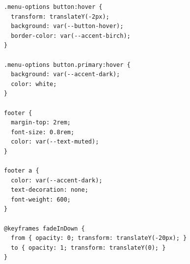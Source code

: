 \begin{scriptsize}
\begin{lstlisting}[language=html, captionpos=b, stepnumber=5, caption = {maincss.css}]
.menu-options button:hover {
  transform: translateY(-2px);
  background: var(--button-hover);
  border-color: var(--accent-birch);
}

.menu-options button.primary:hover {
  background: var(--accent-dark);
  color: white;
}

footer {
  margin-top: 2rem;
  font-size: 0.8rem;
  color: var(--text-muted);
}

footer a {
  color: var(--accent-dark);
  text-decoration: none;
  font-weight: 600;
}

@keyframes fadeInDown {
  from { opacity: 0; transform: translateY(-20px); }
  to { opacity: 1; transform: translateY(0); }
}

\end{lstlisting}
\end{scriptsize}

